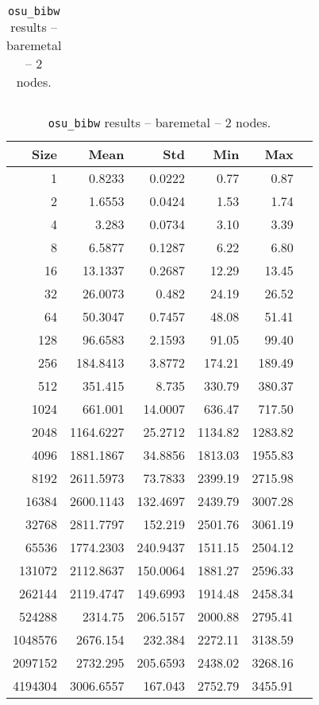 \begin{table}[htbp]
\begin{minipage}{.48\textwidth}
\begin{tabular}{rrrrrr}
	\bottomrule
	\end{tabular}
  \caption{\texttt{osu\_bibw} results -- baremetal -- 1 node.}
  \label{tab:bibw-baremetal-1nodes}
  \end{minipage}
\hfill
\begin{minipage}{.48\textwidth}
    \centering
    \footnotesize
  \begin{tabular}{rrrrrr}
	\toprule
	\textbf{Size} & \textbf{Mean} & \textbf{Std} & \textbf{Min} & \textbf{Max}	\\
	\midrule
	1	&	0.8233   	&	0.0222	&	0.77	&	0.87	\\
	2	&	1.6553   	&	0.0424	&	1.53	&	1.74	\\
	4	&	3.283   	&	0.0734	&	3.10	&	3.39	\\
	8	&	6.5877   	&	0.1287	&	6.22	&	6.80	\\
	16	&	13.1337   	&	0.2687	&	12.29	&	13.45	\\
	32	&	26.0073   	&	0.482	&	24.19	&	26.52	\\
	64	&	50.3047   	&	0.7457	&	48.08	&	51.41	\\
	128	&	96.6583   	&	2.1593	&	91.05	&	99.40	\\
	256	&	184.8413   	&	3.8772	&	174.21	&	189.49	\\
	512	&	351.415   	&	8.735	&	330.79	&	380.37	\\
	1024	&	661.001   	&	14.0007	&	636.47	&	717.50	\\
	2048	&	1164.6227   	&	25.2712	&	1134.82	&	1283.82	\\
	4096	&	1881.1867   	&	34.8856	&	1813.03	&	1955.83	\\
	8192	&	2611.5973   	&	73.7833	&	2399.19	&	2715.98	\\
	16384	&	2600.1143   	&	132.4697	&	2439.79	&	3007.28	\\
	32768	&	2811.7797   	&	152.219	&	2501.76	&	3061.19	\\
	65536	&	1774.2303   	&	240.9437	&	1511.15	&	2504.12	\\
	131072	&	2112.8637   	&	150.0064	&	1881.27	&	2596.33	\\
	262144	&	2119.4747   	&	149.6993	&	1914.48	&	2458.34	\\
	524288	&	2314.75   	&	206.5157	&	2000.88	&	2795.41	\\
	1048576	&	2676.154   	&	232.384	&	2272.11	&	3138.59	\\
	2097152	&	2732.295   	&	205.6593	&	2438.02	&	3268.16	\\
	4194304	&	3006.6557   	&	167.043	&	2752.79	&	3455.91	\\
	\bottomrule
	\end{tabular}
  \caption{\texttt{osu\_bibw} results -- baremetal -- 2 nodes.}
  \label{tab:bibw-baremetal-2nodes}
  \end{minipage}
\end{table}

